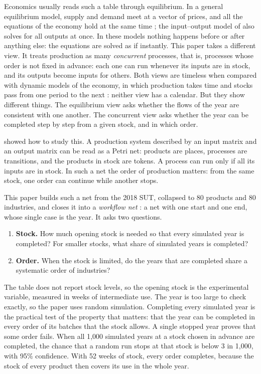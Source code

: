 \documentclass[11pt]{article}
\begin{document}
Economics usually reads such a table through equilibrium. In a general equilibrium model, supply and demand meet at a vector of prices, and all the equations of the economy hold at the same time \citep{ArrowDebreu1954}; the input--output model of \citet{Leontief1936} also solves for all outputs at once. In these models nothing happens before or after anything else: the equations are solved as if instantly. This paper takes a different view. It treats production as many \emph{concurrent} processes, that is, processes whose order is not fixed in advance: each one can run whenever its inputs are in stock, and its outputs become inputs for others. Both views are timeless when compared with dynamic models of the economy, in which production takes time and stocks pass from one period to the next \citep{KydlandPrescott1982}: neither view has a calendar. But they show different things. The equilibrium view asks whether the flows of the year are consistent with one another. The concurrent view asks whether the year can be completed step by step from a given stock, and in which order.

\citet{Bonanno1993,Bonanno1995} showed how to study this. A production system described by an input matrix and an output matrix can be read as a Petri net: products are places, processes are transitions, and the products in stock are tokens. A process can run only if all its inputs are in stock. In such a net the order of production matters: from the same stock, one order can continue while another stops.

This paper builds such a net from the 2018 SUT, collapsed to 80 products and 80 industries, and closes it into a \emph{workflow net} \citep{vanderAalst1997,vanderAalst1998}: a net with one start and one end, whose single case is the year. It asks two questions.
\begin{enumerate}[label=\textbf{Q\arabic*.},leftmargin=*]
\item \textbf{Stock.} How much opening stock is needed so that every simulated year is completed? For smaller stocks, what share of simulated years is completed?
\item \textbf{Order.} When the stock is limited, do the years that are completed share a systematic order of industries?
\end{enumerate}

The table does not report stock levels, so the opening stock is the experimental variable, measured in weeks of intermediate use. The year is too large to check exactly, so the paper uses random simulation. Completing every simulated year is the practical test of the property that matters: that the year can be completed in every order of its batches that the stock allows. A single stopped year proves that some order fails. When all 1{,}000 simulated years at a stock chosen in advance are completed, the chance that a random run stops at that stock is below 3 in 1{,}000, with 95\% confidence. With 52 weeks of stock, every order completes, because the stock of every product then covers its use in the whole year.
\end{document}

